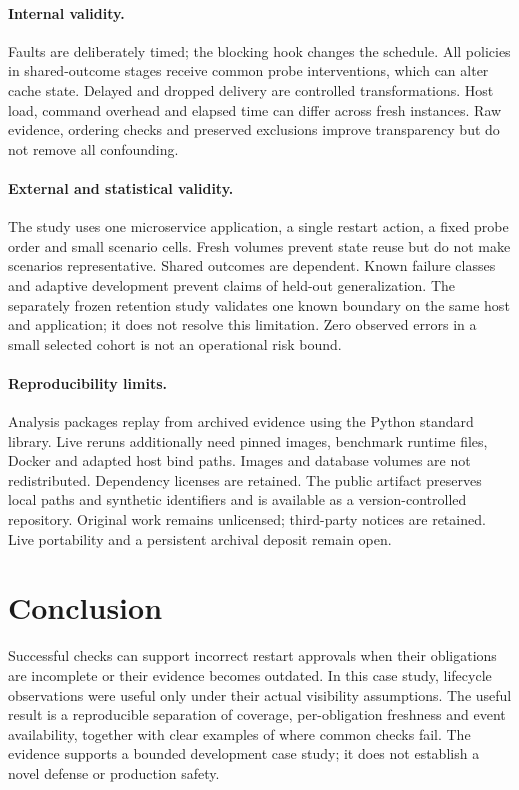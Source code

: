 \documentclass[manuscript,review,nonacm]{acmart}
\begin{document}
\paragraph{Internal validity.} Faults are deliberately timed; the blocking hook changes the schedule. All policies in shared-outcome stages receive common probe interventions, which can alter cache state. Delayed and dropped delivery are controlled transformations. Host load, command overhead and elapsed time can differ across fresh instances. Raw evidence, ordering checks and preserved exclusions improve transparency but do not remove all confounding.

\paragraph{External and statistical validity.} The study uses one microservice application, a single restart action, a fixed probe order and small scenario cells. Fresh volumes prevent state reuse but do not make scenarios representative. Shared outcomes are dependent. Known failure classes and adaptive development prevent claims of held-out generalization. The separately frozen retention study validates one known boundary on the same host and application; it does not resolve this limitation. Zero observed errors in a small selected cohort is not an operational risk bound.

\paragraph{Reproducibility limits.} Analysis packages replay from archived evidence using the Python standard library. Live reruns additionally need pinned images, benchmark runtime files, Docker and adapted host bind paths. Images and database volumes are not redistributed. Dependency licenses are retained. The public artifact preserves local paths and synthetic identifiers and is available as a version-controlled repository. Original work remains unlicensed; third-party notices are retained. Live portability and a persistent archival deposit remain open.

\section{Conclusion}
Successful checks can support incorrect restart approvals when their obligations are incomplete or their evidence becomes outdated. In this case study, lifecycle observations were useful only under their actual visibility assumptions. The useful result is a reproducible separation of coverage, per-obligation freshness and event availability, together with clear examples of where common checks fail. The evidence supports a bounded development case study; it does not establish a novel defense or production safety.
\end{document}
